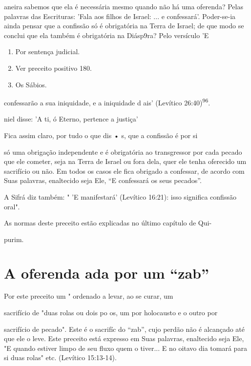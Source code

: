 aneira sabemos que ela é necessária mesmo quando não há uma oferen­da?
Pelas palavras das Escrituras: 'Fala aos filhos de Israel: ... e
confessará'. Poder-se-ia ainda pensar que a confissão só é obrigatória
na Terra de Israel; de que modo se conclui que ela também é obrigatória
na Diásp9ra? Pelo versículo 'E


\begin{enumerate}
\def\labelenumi{\arabic{enumi}.}
\setcounter{enumi}{92}
\item
 
 Por sentença judicial.
 
\item
 
 Ver preceito positivo 180.
 
\item
 
 Os Sábios.
 
\end{enumerate}

confessarão a sua iniquidade, e a iniquidade d ais' (Levítico
26:40)\textsuperscript{96}.

niel disse: 'A ti, ó Eterno, pertence a justiça'

Fica assim claro, por tudo o que dis • s, que a confissão é por si

só uma obrigação independente e é obrigatória ao transgressor por cada
peca­do que ele cometer, seja na Terra de Israel ou fora dela, quer ele
tenha ofereci­do um sacrifício ou não. Em todos os casos ele fica
obrigado a confessar, de acordo com Suas palavras, enaltecido seja Ele,
``E confessará os seus pecados''.

A Sifrá diz também: " 'E manifestará' (Levítico 16:21): isso significa
confissão oral".


As normas deste preceito estão explicadas no último capítulo de Qui-


purim.


\section{A oferenda ada por um ``zab''}


Por este preceito um " ordenado a levar, ao se curar, um

sacrifício de "duas rolas ou dois po os, um por holocausto e o outro por

sacrifício de pecado". Este é o sacrifíc do ``zab'', cujo perdão não é
alcança­do até que ele o leve. Este preceito está expresso em Suas
palavras, enaltecido seja Ele, "E quando estiver limpo de seu fluxo quem
o tiver... E no oitavo dia tomará para si duas rolas" etc. (Levítico
15:13-14).

